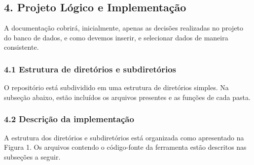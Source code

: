 \documentclass[11pt]{article}
\begin{document}
\subsection{4. Projeto Lógico e Implementação}
\label{sec:orgb8ee4f2}
A documentação cobrirá, inicialmente, apenas as decisões realizadas no projeto do banco de dados, e como devemos inserir, e selecionar dados de maneira consistente.
\subsubsection{4.1 Estrutura de diretórios e subdiretórios}
\label{sec:org4569861}
O repositório está subdividido em uma estrutura de diretórios simples. Na subseção abaixo, estão incluídos os arquivos presentes e as funções de cada pasta.
\subsubsection{4.2 Descrição da implementação}
\label{sec:org22a5369}
A estrutura dos diretórios e subdiretórios está organizada como apresentado na Figura 1. Os arquivos contendo o código-fonte da ferramenta estão descritos nas subseções a seguir.
\end{document}
